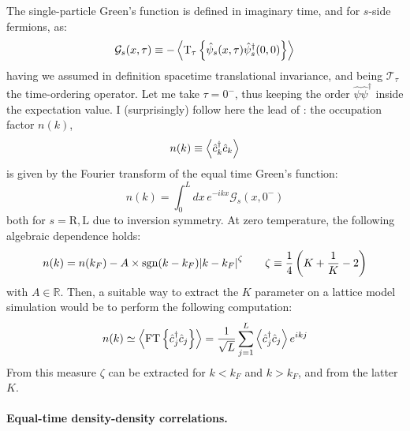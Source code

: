 The single-particle Green's function is defined in imaginary time, and for $s$-side fermions, as:
\[
	\mathcal{G}_s (x,\tau) \equiv - \ev{\mathrm{T}_\tau \left\{ \hat \psi_s (x,\tau) \hat \psi_s ^\dagger (0,0) \right\}}
\]
having we assumed in definition spacetime translational invariance, and being $\mathcal{T}_\tau$ the time-ordering operator. Let me take $\tau = 0^-$, thus keeping the order $\hat \psi \hat \psi^\dagger$ inside the expectation value. I (surprisingly) follow here the lead of \cite{giamarchi2003quantum, senechal1999introduction}: the occupation factor $n(k)$,
\[
	n(k) \equiv \ev{\hat c_k^\dagger \hat c_k}
\]
is given by the Fourier transform of the equal time Green's function:
\[
	n(k) = \int_0^L dx \, e^{-ikx} \mathcal{G}_s (x,0^-)
\]
both for $s=\mathrm{R}, \mathrm{L}$ due to inversion symmetry. At zero temperature, the following algebraic dependence holds:
\[
	n(k) = n(k_F) - A \times \mathrm{sgn}(k-k_F) \abs{k-k_F}^\zeta
	\qquad
	\zeta \equiv \frac{1}{4} \left( K + \frac{1}{K} - 2 \right)
\]
with $A \in \mathbb{R}$. Then, a suitable way to extract the $K$ parameter on a lattice model simulation would be to perform the following computation:
\[
	n(k) \simeq \ev{ \mathrm{FT} \left\{ \hat c_j^\dagger \hat c_j \right\} } = \frac{1}{\sqrt{L}} \sum_{j=1}^L \ev{ \hat c_j^\dagger \hat c_j } e^{i k j}
\]
From this measure $\zeta$ can be extracted for $k<k_F$ and $k>k_F$, and from the latter $K$.

\paragraph{Equal-time density-density correlations.}

